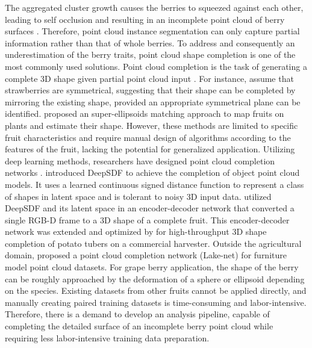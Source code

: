 \documentclass[12pt]{article}
\begin{document}
The aggregated cluster growth causes the berries to squeezed against each other, leading to self occlusion and resulting in an incomplete point cloud of berry surfaces \citep{du_instance_2023}. 
Therefore, point cloud instance segmentation can only capture partial information rather than that of whole berries.
To address  and consequently an underestimation of the berry traits, point cloud shape completion is one of the most commonly used solutions.
Point cloud completion is the task of generating a complete 3D shape given partial point cloud input \citep{tesema_point_2024}. 
For instance, \citet{ge_symmetrybased_2020} assume that strawberries are symmetrical, suggesting that their shape can be completed by mirroring the existing shape, provided an appropriate symmetrical plane can be identified.
\citet{marangoz_fruit_2022} proposed an super-ellipsoids matching approach to map fruits on plants and estimate their shape.
However, these methods are limited to specific fruit characteristics and require manual design of algorithms according to the features of the fruit, lacking the potential for generalized application.
Utilizing deep learning methods, researchers have designed point cloud completion networks \citep{wang_unsupervised_2021}. 
\citet{park_deepsdf_2019} introduced DeepSDF to achieve the completion of object point cloud models. It uses a learned continuous signed distance function to represent a class of shapes in latent space and is tolerant to noisy 3D input data. 
\citet{magistri_contrastive_2022} utilized DeepSDF and its latent space in an encoder-decoder network that converted a single RGB-D frame to a 3D shape of a complete fruit. 
This encoder-decoder network was extended and optimized by \citet{blok_highthroughput_2025} for high-throughput 3D shape completion of potato tubers on a commercial harvester. Outside the agricultural domain, \citet{tang_lakenet_2022} proposed a point cloud completion network (Lake-net) for furniture model point cloud datasets. 
For grape berry application, the shape of the berry can be roughly approached by the deformation of a sphere or ellipsoid depending on the species. 
Existing datasets from other fruits cannot be applied directly, and manually creating paired training datasets is time-consuming and labor-intensive.
Therefore, there is a demand to develop an analysis pipeline, capable of completing the detailed surface of an incomplete berry point cloud while requiring less labor-intensive training data preparation.
\end{document}
